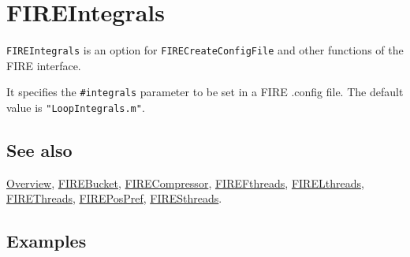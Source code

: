 \documentclass[../FeynHelpersManual.tex]{subfiles}
\begin{document}
\hypertarget{fireintegrals}{
\section{FIREIntegrals}\label{fireintegrals}}

\texttt{FIREIntegrals} is an option for \texttt{FIRECreateConfigFile}
and other functions of the FIRE interface.

It specifies the \texttt{\#{}\allowbreak{}integrals} parameter to be set
in a FIRE .config file. The default value is \texttt{"LoopIntegrals.m"}.

\subsection{See also}

\hyperlink{toc}{Overview}, \hyperlink{firebucket}{FIREBucket},
\hyperlink{firecompressor}{FIRECompressor},
\hyperlink{firefthreads}{FIREFthreads},
\hyperlink{firelthreads}{FIRELthreads},
\hyperlink{firethreads}{FIREThreads},
\hyperlink{firepospref}{FIREPosPref},
\hyperlink{firesthreads}{FIRESthreads}.

\subsection{Examples}
\end{document}
